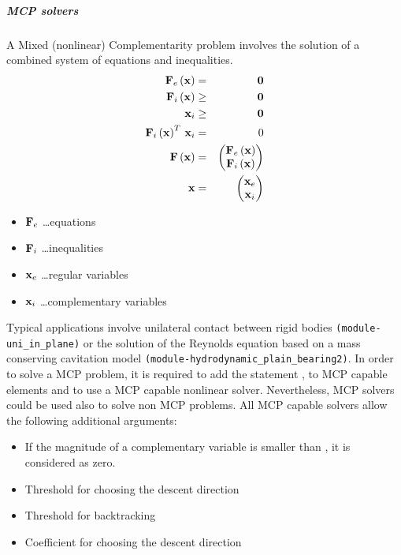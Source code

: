 \subparagraph{MCP solvers}
A Mixed (nonlinear) Complementarity problem involves the solution of a combined system of equations and inequalities.
\begin{eqnarray}
  \bold{F}_e\left(\bold{x}\right) & = & \bold{0} \\
  \bold{F}_i\left(\bold{x}\right) & \ge & \bold{0} \\
  \bold{x}_i & \ge & \bold{0} \\
  \bold{F}_i\left(\bold{x}\right)^T \, \bold{x}_i & = & 0 \\
  \bold{F}\left(\bold{x}\right) & = & \begin{pmatrix}
    \bold{F}_e\left(\bold{x}\right) \\
    \bold{F}_i\left(\bold{x}\right)
  \end{pmatrix} \\
  \bold{x} & = & \begin{pmatrix}
    \bold{x}_e \\
    \bold{x}_i
  \end{pmatrix}
\end{eqnarray}
\begin{itemize}
\item $\bold{F}_e$ \dots equations
\item $\bold{F}_i$ \dots inequalities
\item $\bold{x}_e$ \dots regular variables
\item $\bold{x}_i$ \dots complementary variables
\end{itemize}
Typical applications involve unilateral contact between rigid bodies \verb;(module-uni_in_plane); or the solution of the Reynolds equation based on a mass conserving cavitation model \verb;(module-hydrodynamic_plain_bearing2);.
In order to solve a MCP problem, it is required to add the statement ,  to MCP capable elements and to use a MCP capable nonlinear solver.
Nevertheless, MCP solvers could be used also to solve non MCP problems.
All MCP capable solvers allow the following additional arguments:
\begin{itemize}
\item {} If the magnitude of a complementary variable is smaller than , it is considered as zero.
\item {} Threshold for choosing the descent direction
\item {} Threshold for backtracking
\item {} Coefficient for choosing the descent direction
\end{itemize}

